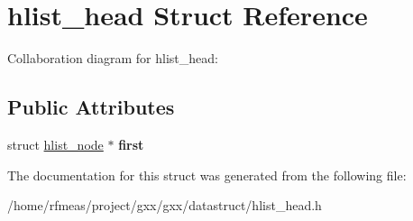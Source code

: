 \hypertarget{structhlist__head}{}\section{hlist\+\_\+head Struct Reference}
\label{structhlist__head}


Collaboration diagram for hlist\+\_\+head\+:
\subsection*{Public Attributes}
\begin{DoxyCompactItemize}
\item 
struct \hyperlink{structhlist__node}{hlist\+\_\+node} $\ast$ {\bfseries first}\hypertarget{structhlist__head_a247198a722f93022121b73aee62006bb}{}\label{structhlist__head_a247198a722f93022121b73aee62006bb}

\end{DoxyCompactItemize}


The documentation for this struct was generated from the following file\+:\begin{DoxyCompactItemize}
\item 
/home/rfmeas/project/gxx/gxx/datastruct/hlist\+\_\+head.\+h\end{DoxyCompactItemize}
